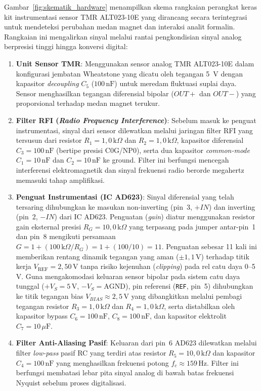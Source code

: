 Gambar~\ref{fig:skematik_hardware} menampilkan skema rangkaian perangkat keras kit instrumentasi sensor TMR ALT023-10E yang dirancang secara terintegrasi untuk mendeteksi perubahan medan magnet dan interaksi analit formalin. Rangkaian ini mengalirkan sinyal melalui rantai pengkondisian sinyal analog berpresisi tinggi hingga konversi digital:
\begin{enumerate}[label=\alph*)]
    \item \textbf{Unit Sensor TMR}: Menggunakan sensor analog TMR ALT023-10E dalam konfigurasi jembatan Wheatstone yang dicatu oleh tegangan 5~V dengan kapasitor \textit{decoupling} $C_5$ ($100\,\text{nF}$) untuk meredam fluktuasi suplai daya. Sensor menghasilkan tegangan diferensial bipolar ($OUT+$ dan $OUT-$) yang proporsional terhadap medan magnet terukur.
    \item \textbf{Filter RFI (\textit{Radio Frequency Interference})}: Sebelum masuk ke penguat instrumentasi, sinyal dari sensor dilewatkan melalui jaringan filter RFI yang tersusun dari resistor $R_1 = 1{,}0\,\text{k}\Omega$ dan $R_2 = 1{,}0\,\text{k}\Omega$, kapasitor diferensial $C_3 = 100\,\text{nF}$ (bertipe presisi C0G/NP0), serta dua kapasitor \textit{common-mode} $C_1 = 10\,\text{nF}$ dan $C_2 = 10\,\text{nF}$ ke ground. Filter ini berfungsi mencegah interferensi elektromagnetik dan sinyal frekuensi radio berorde megahertz memasuki tahap amplifikasi.
    \item \textbf{Penguat Instrumentasi (IC AD623)}: Sinyal diferensial yang telah tersaring dihubungkan ke masukan non-inverting (pin~3, $+IN$) dan inverting (pin~2, $-IN$) dari IC AD623. Penguatan (\textit{gain}) diatur menggunakan resistor gain eksternal presisi $R_G = 10{,}0\,\text{k}\Omega$ yang terpasang pada jumper antar-pin~1 dan pin~8 mengikuti persamaan $G = 1 + (100\,\text{k}\Omega / R_G) = 1 + (100 / 10) = 11$. Penguatan sebesar 11 kali ini memberikan rentang dinamik tegangan yang aman ($\pm 1{,}1\,\text{V}$) terhadap titik kerja $V_{\text{REF}} = 2{,}50\,\text{V}$ tanpa risiko kejenuhan (\textit{clipping}) pada rel catu daya 0--5 V. Guna mengakomodasi keluaran sensor bipolar pada sistem catu daya tunggal ($+V_S = 5\,\text{V}$, $-V_S = \text{AGND}$), pin referensi (\texttt{REF}, pin~5) dihubungkan ke titik tegangan bias $V_{BIAS} \approx 2{,}5\,\text{V}$ yang dibangkitkan melalui pembagi tegangan resistor $R_3 = 1{,}0\,\text{k}\Omega$ dan $R_4 = 1{,}0\,\text{k}\Omega$, serta distabilkan oleh kapasitor bypass $C_6 = 100\,\text{nF}$, $C_8 = 100\,\text{nF}$, dan kapasitor elektrolit $C_7 = 10\,\mu\text{F}$.
    \item \textbf{Filter Anti-Aliasing Pasif}: Keluaran dari pin~6 AD623 dilewatkan melalui filter \textit{low-pass} pasif RC yang terdiri atas resistor $R_5 = 10{,}0\,\text{k}\Omega$ dan kapasitor $C_4 = 100\,\text{nF}$ yang menghasilkan frekuensi potong $f_c \approx 159\,\text{Hz}$. Filter ini berfungsi membatasi lebar pita sinyal analog di bawah batas frekuensi Nyquist sebelum proses digitalisasi.

\end{enumerate}
